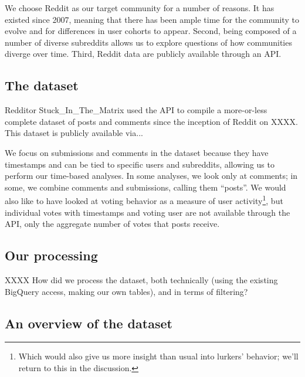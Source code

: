 We choose Reddit as our target community for a number of reasons.  It has existed since 2007, meaning that there has been ample time for the community to evolve and for differences in user cohorts to appear.  Second, being composed of a number of diverse subreddits allows us to explore questions of how communities diverge over time.  Third, Reddit data are publicly available through an API.

\subsection{The dataset}

Redditor Stuck\_In\_The\_Matrix used the API to compile a more-or-less complete dataset of posts and comments since the inception of Reddit on XXXX.  This dataset is publicly available via...



We focus on submissions and comments in the dataset because they have timestamps and can be tied to specific users and subreddits, allowing us to perform our time-based analyses.   In some analyses, we look only at comments; in some, we combine comments and submissions, calling them ``posts''.  We would also like to have looked at voting behavior as a measure of user activity\footnote{Which would also give us more insight than usual into lurkers' behavior; we'll return to this in the discussion.}, but individual votes with timestamps and voting user are not available through the API, only the aggregate number of votes that posts receive.


\subsection{Our processing}

XXXX How did we process the dataset, both technically (using the existing BigQuery access, making our own tables), and in terms of filtering?

\subsection{An overview of the dataset}


